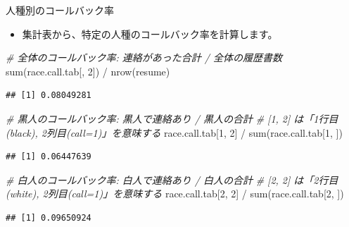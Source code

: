 \documentclass[
  ignorenonframetext,
]{beamer}
\newenvironment{Shaded}{\begin{snugshade}}{\end{snugshade}}
\newcommand{\CommentTok}[1]{\textcolor[rgb]{0.56,0.35,0.01}{\textit{#1}}}
\newcommand{\DecValTok}[1]{\textcolor[rgb]{0.00,0.00,0.81}{#1}}
\newcommand{\FunctionTok}[1]{\textcolor[rgb]{0.00,0.00,0.00}{#1}}
\newcommand{\NormalTok}[1]{#1}
\newcommand{\SpecialCharTok}[1]{\textcolor[rgb]{0.00,0.00,0.00}{#1}}
\providecommand{\tightlist}{%
  \setlength{\itemsep}{0pt}\setlength{\parskip}{0pt}}
\begin{document}
\begin{frame}[fragile]{人種別のコールバック率}
\protect\hypertarget{ux4ebaux7a2eux5225ux306eux30b3ux30fcux30ebux30d0ux30c3ux30afux7387}{}
\begin{itemize}
\tightlist
\item
  集計表から、特定の人種のコールバック率を計算します。
\end{itemize}

\scriptsize

\begin{Shaded}
\begin{Highlighting}[]
\CommentTok{\# 全体のコールバック率: 連絡があった合計 / 全体の履歴書数}
\FunctionTok{sum}\NormalTok{(race.call.tab[, }\DecValTok{2}\NormalTok{]) }\SpecialCharTok{/} \FunctionTok{nrow}\NormalTok{(resume)}
\end{Highlighting}
\end{Shaded}

\begin{verbatim}
## [1] 0.08049281
\end{verbatim}

\begin{Shaded}
\begin{Highlighting}[]
\CommentTok{\# 黒人のコールバック率: 黒人で連絡あり / 黒人の合計}
\CommentTok{\# [1, 2] は「1行目(black), 2列目(call=1)」を意味する}
\NormalTok{race.call.tab[}\DecValTok{1}\NormalTok{, }\DecValTok{2}\NormalTok{] }\SpecialCharTok{/} \FunctionTok{sum}\NormalTok{(race.call.tab[}\DecValTok{1}\NormalTok{, ]) }
\end{Highlighting}
\end{Shaded}

\begin{verbatim}
## [1] 0.06447639
\end{verbatim}

\begin{Shaded}
\begin{Highlighting}[]
\CommentTok{\# 白人のコールバック率: 白人で連絡あり / 白人の合計}
\CommentTok{\# [2, 2] は「2行目(white), 2列目(call=1)」を意味する}
\NormalTok{race.call.tab[}\DecValTok{2}\NormalTok{, }\DecValTok{2}\NormalTok{] }\SpecialCharTok{/} \FunctionTok{sum}\NormalTok{(race.call.tab[}\DecValTok{2}\NormalTok{, ]) }
\end{Highlighting}
\end{Shaded}

\begin{verbatim}
## [1] 0.09650924
\end{verbatim}

\normalsize
\end{frame}
\end{document}
